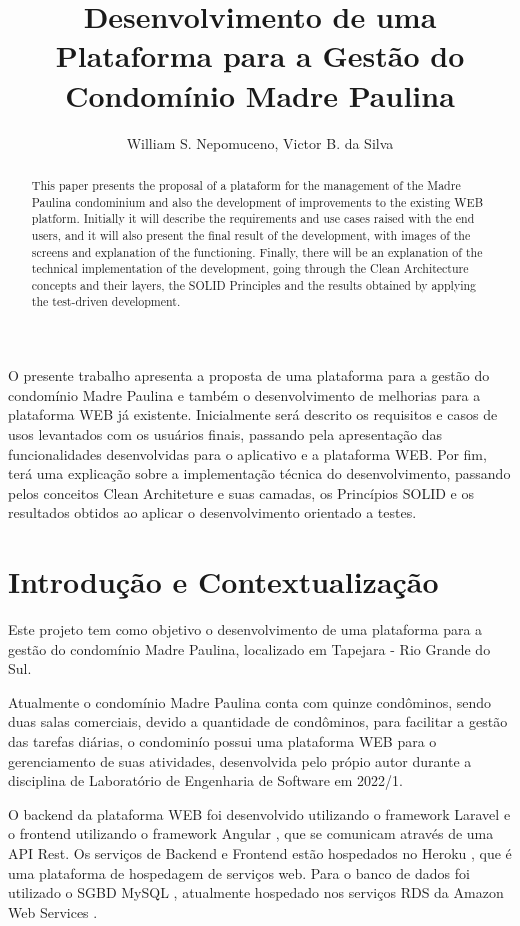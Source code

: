 \documentclass[12pt]{article}
\title{Desenvolvimento de uma Plataforma para a Gestão do Condomínio Madre Paulina}
\author{William S. Nepomuceno\inst{1}, Victor B. da Silva\inst{1}}
\begin{document}
\maketitle

\begin{abstract}
This paper presents the proposal of a plataform for the management of the Madre Paulina condominium and also the development of improvements to the existing WEB platform. Initially it will describe the requirements and use cases raised with the end users, and it will also present the final result of the development, with images of the screens and explanation of the functioning. Finally, there will be an explanation of the technical implementation of the development, going through the Clean Architecture concepts and their layers, the SOLID Principles and the results obtained by applying the test-driven development.
\end{abstract}

\begin{resumo}
O presente trabalho apresenta a proposta de uma plataforma para a gestão do condomínio Madre Paulina e também o desenvolvimento de melhorias para a plataforma WEB já existente. Inicialmente será descrito os requisitos e casos de usos levantados com os usuários finais, passando pela apresentação das funcionalidades desenvolvidas para o aplicativo e a plataforma WEB. Por fim, terá uma explicação sobre a implementação técnica do desenvolvimento, passando pelos conceitos Clean Architeture e suas camadas, os Princípios SOLID e os resultados obtidos ao aplicar o desenvolvimento orientado a testes.
\end{resumo}

\section{Introdução e Contextualização}
Este projeto tem como objetivo o desenvolvimento de uma plataforma para a gestão do condomínio Madre Paulina, localizado em Tapejara - Rio Grande do Sul.

Atualmente o condomínio Madre Paulina conta com quinze condôminos, sendo duas salas comerciais, devido a quantidade de condôminos, para facilitar a gestão das tarefas diárias, o condominío possui uma plataforma WEB para o gerenciamento de suas atividades, desenvolvida pelo própio autor durante a disciplina de Laboratório de Engenharia de Software em 2022/1.

O backend da plataforma WEB foi desenvolvido utilizando o framework Laravel \cite{laravel} e o frontend utilizando o framework Angular \cite{angular}, que se comunicam através de uma API Rest.
Os serviços de Backend e Frontend estão hospedados no Heroku \cite{appMadrePaulinaWeb}, que é uma plataforma de hospedagem de serviços web. Para o banco de dados foi utilizado o SGBD MySQL \cite{mysql}, atualmente hospedado nos serviços RDS da Amazon Web Services \cite{amazonrds}.
\end{document}
